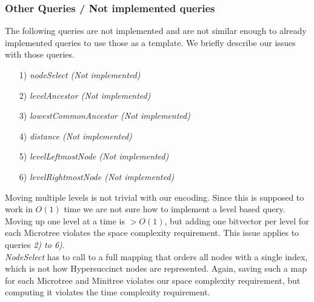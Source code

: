 \documentclass{article}
\begin{document}
\subsubsection{Other Queries / Not implemented queries}
The following queries are not implemented and are not similar enough to already implemented queries to use those as a template. We briefly describe our issues with those queries.
\begin{itemize}
	\item[1)] \textit{nodeSelect (Not implemented)}
	\item[2)] \textit{levelAncestor (Not implemented)}
	\item[3)] \textit{lowestCommonAncestor (Not implemented)}
	\item[4)] \textit{distance (Not implemented)}
	\item[5)] \textit{levelLeftmostNode (Not implemented)}
	\item[6)] \textit{levelRightmostNode (Not implemented)}
\end{itemize}
Moving multiple levels is not trivial with our encoding. Since this is supposed to work in $O(1)$ time we are not sure how to implement a level based query. Moving up one level at a time is $> O(1)$, but adding one bitvector per level for each Microtree violates the space complexity requirement. This issue applies to queries \textit{2) to 6)}.\\
\textit{NodeSelect} has to call to a full mapping that orders all nodes with a single index, which is not how Hypersuccinct nodes are represented. Again, saving such a map for each Microtree and Minitree violates our space complexity requirement, but computing it violates the time complexity requirement.
\end{document}
